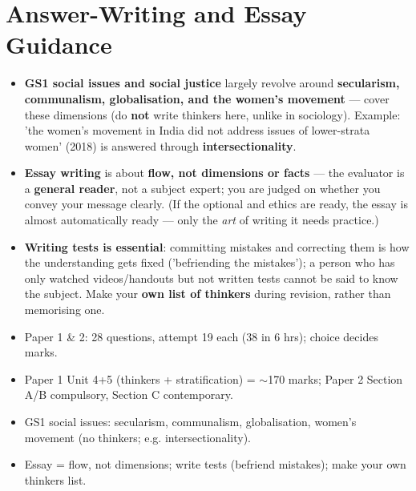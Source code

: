 \section{Answer-Writing and Essay Guidance}

\begin{KeyConcept}
\begin{itemize}
\item \textbf{GS1 social issues and social justice} largely revolve around \textbf{secularism, communalism, globalisation, and the women's movement} --- cover these dimensions (do \textbf{not} write thinkers here, unlike in sociology). Example: 'the women's movement in India did not address issues of lower-strata women' (2018) is answered through \textbf{intersectionality}.
\item \textbf{Essay writing} is about \textbf{flow, not dimensions or facts} --- the evaluator is a \textbf{general reader}, not a subject expert; you are judged on whether you convey your message clearly. (If the optional and ethics are ready, the essay is almost automatically ready --- only the \emph{art} of writing it needs practice.)
\item \textbf{Writing tests is essential}: committing mistakes and correcting them is how the understanding gets fixed ('befriending the mistakes'); a person who has only watched videos/handouts but not written tests cannot be said to know the subject. Make your \textbf{own list of thinkers} during revision, rather than memorising one.
\end{itemize}
\end{KeyConcept}

\begin{QuickRevision}
\begin{itemize}
\item Paper 1 \& 2: 28 questions, attempt 19 each (38 in 6 hrs); choice decides marks.
\item Paper 1 Unit 4+5 (thinkers + stratification) = $\sim$170 marks; Paper 2 Section A/B compulsory, Section C contemporary.
\item GS1 social issues: secularism, communalism, globalisation, women's movement (no thinkers; e.g. intersectionality).
\item Essay = flow, not dimensions; write tests (befriend mistakes); make your own thinkers list.
\end{itemize}
\end{QuickRevision}
